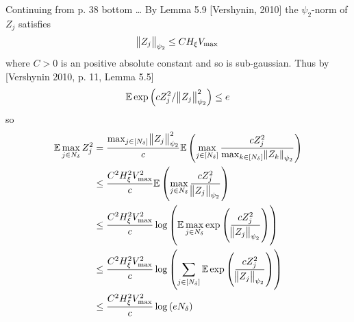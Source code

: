 \documentclass{article}
\begin{document}
\noindent
Continuing from p. 38 bottom \dots 
By Lemma 5.9 [Vershynin, 2010] the $\psi_2$-norm of $Z_j$ satisfies
\begin{equation}
  \norm{Z_j}_{\psi_2} \leq C H_\xi V_{\max}
\end{equation}
where $C>0$ is an positive absolute constant
and so is sub-gaussian. Thus by [Vershynin 2010, p. 11, Lemma 5.5]
\begin{equation}
  \mathbb{E} \exp \left(c Z_j^2/\norm{Z_j}_{\psi_2}^2 \right) \leq e
\end{equation}
so
\begin{align}
  \mathbb{E} \max_{j \in N_\delta} Z_j^2
  = &\; \frac{\max_{j \in [N_\delta]} \norm{Z_j}_{\psi_2}^2}{c}
  \mathbb{E} \left( \max_{j \in [N_\delta]} \frac{  c Z_j^2 } 
  {\max_{k \in [N_\delta]} \norm{Z_k}_{\psi_2}} \right)
  \\ \leq &\; \frac{C^2 H_\xi^2 V_{\max}^2}{c}
  \mathbb{E} \left( \max_{j \in N_\delta} \frac{  c Z_j^2 } 
  {\norm{Z_j}_{\psi_2}} \right)
  \\ \leq &\; \frac{C^2 H_\xi^2 V_{\max}^2}{c}
  \log \left( \mathbb{E} \max_{j \in N_\delta} \exp \left( \frac{  c Z_j^2 } 
  {\norm{Z_j}_{\psi_2}} \right) \right)
  \\ \leq &\; \frac{C^2 H_\xi^2 V_{\max}^2}{c}
  \log \left( \sum_{j \in [N_\delta]} \mathbb{E} \exp \left( \frac{  c Z_j^2 } 
  {\norm{Z_j}_{\psi_2}} \right) \right)
  \\ \leq &\; \frac{C^2 H_\xi^2 V_{\max}^2}{c}
  \log \left( e N_\delta \right)
\end{align}
\end{document}
